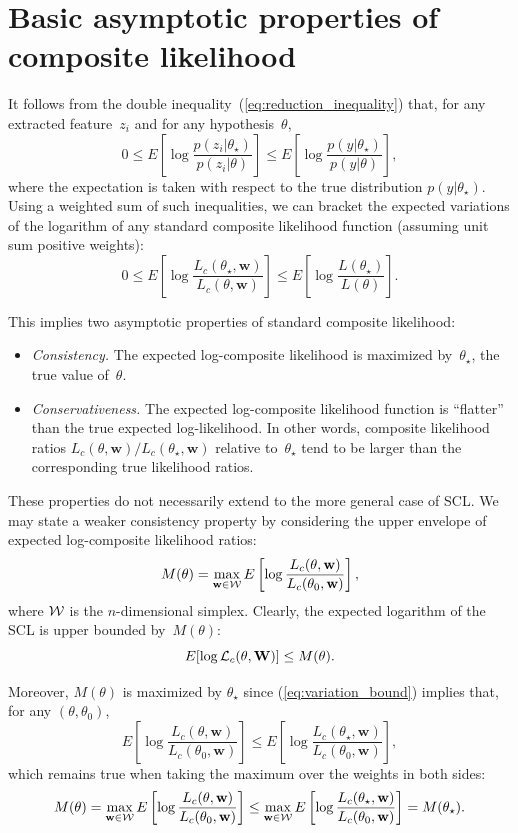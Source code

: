 \documentclass[english]{scrartcl}
\begin{document}
\section{Basic asymptotic properties of composite likelihood}
\label{sec:asymptotic}

It follows from the double inequality~(\ref{eq:reduction_inequality}) that, for any extracted feature~$z_i$ and for any hypothesis~$\theta$,
$$
0 \leq
E\left[
\log \frac{p(z_i|\theta_\star)}{p(z_i|\theta)}
\right]
\leq
E\left[
\log \frac{p(y|\theta_\star)}{p(y|\theta)}
\right],
$$
where the expectation is taken with respect to the true distribution $p(y|\theta_\star)$. Using a weighted sum of such inequalities, we can bracket the expected variations of the logarithm of any standard composite likelihood function (assuming unit sum positive weights):
\begin{equation}
\label{eq:variation_bound}
0 \leq
E\left[ \log \frac{L_c(\theta_\star, \mathbf{w})}{L_c(\theta, \mathbf{w})} \right]
\leq 
E\left[ \log \frac{L(\theta_\star)}{L(\theta)} \right]
.
\end{equation}

This implies two asymptotic properties of standard composite likelihood: 
\begin{itemize}
\item {\em Consistency.} The expected log-composite likelihood is maximized by~$\theta_\star$, the true value of~$\theta$.
\item {\em Conservativeness.} The expected log-composite likelihood function is ``flatter'' than the true expected log-likelihood. In other words, composite likelihood ratios $L_c(\theta, \mathbf{w})/L_c(\theta_\star, \mathbf{w})$ relative to~$\theta_\star$ tend to be larger than the corresponding true likelihood ratios. 
\end{itemize}

These properties do not necessarily extend to the more general case of SCL. We may state a weaker consistency property by considering the upper envelope of expected log-composite likelihood ratios:
$$
M(\theta) = \max_{\mathbf{w}\in{\cal W}} E\left[ \log \frac{L_c(\theta, \mathbf{w})}{L_c(\theta_0, \mathbf{w})} \right],
$$
where ${\cal W}$ is the $n$-dimensional simplex. Clearly, the expected logarithm of the SCL is upper bounded by~$M(\theta)$:
$$
E[\log {\cal L}_c(\theta, \mathbf{W})] \leq M(\theta)
.
$$

Moreover, $M(\theta)$ is maximized by $\theta_\star$ since (\ref{eq:variation_bound}) implies that, for any $(\theta,\theta_0)$,
$$
E\left[ \log \frac{L_c(\theta, \mathbf{w})}{L_c(\theta_0, \mathbf{w})} \right]
\leq
E\left[ \log \frac{L_c(\theta_\star, \mathbf{w})}{L_c(\theta_0, \mathbf{w})} \right],
$$
which remains true when taking the maximum over the weights in both sides: 
$$
M(\theta) = 
\max_{\mathbf{w}\in{\cal W}} E\left[ \log \frac{L_c(\theta, \mathbf{w})}{L_c(\theta_0, \mathbf{w})} \right]
\leq
\max_{\mathbf{w}\in{\cal W}} E\left[ \log \frac{L_c(\theta_\star, \mathbf{w})}{L_c(\theta_0, \mathbf{w})} \right]
= M(\theta_\star)
.
$$
\end{document}
